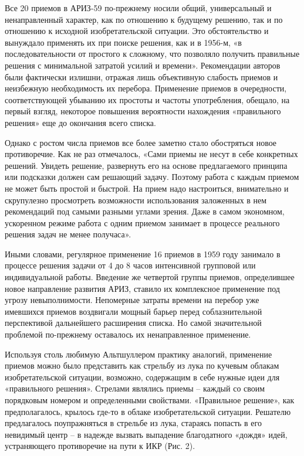 \documentclass[11pt,a4paper]{article}
\begin{document}
Все 20 приемов в АРИЗ-59 по-прежнему носили общий, универсальный и
ненаправленный характер, как по отношению к будущему решению, так и по
отношению к исходной изобретательской ситуации. Это обстоятельство и вынуждало
применять их при поиске решения, как и в 1956-м, «в последовательности от
простого к сложному, что позволяло получить правильные решения с минимальной
затратой усилий и времени». Рекомендации авторов были фактически излишни,
отражая лишь объективную слабость приемов и неизбежную необходимость их
перебора. Применение приемов в очередности, соответствующей убыванию их
простоты и частоты употребления, обещало, на первый взгляд, некоторое
повышения вероятности нахождения «правильного решения» еще до окончания всего
списка.

Однако с ростом числа приемов все более заметно стало обостряться новое
противоречие. Как не раз отмечалось, «Сами приемы не несут в себе конкретных
решений. Увидеть решение, развернуть его на основе предлагаемого принципа или
подсказки должен сам решающий задачу. Поэтому работа с каждым приемом не может
быть простой и быстрой. На прием надо настроиться, внимательно и скрупулезно
просмотреть возможности использования заложенных в нем рекомендаций под самыми
разными углами зрения. Даже в самом экономном, ускоренном режиме работа с
одним приемом занимает в процессе реального решения задач не менее
получаса». \cite{Kudryavtsev}

Иными словами, регулярное применение 16 приемов в 1959 году занимало в
процессе решения задачи от 4 до 8 часов интенсивной групповой или
индивидуальной работы. Введение же четвертой группы приемов, определившее
новое направление развития АРИЗ, ставило их комплексное применение под угрозу
невыполнимости. Непомерные затраты времени на перебор уже имевшихся приемов
воздвигали мощный барьер перед соблазнительной перспективой дальнейшего
расширения списка. Но самой значительной проблемой по-прежнему оставалось их
ненаправленное применение.

Используя столь любимую Альтшуллером практику аналогий, применение приемов
можно было представить как стрельбу из лука по кучевым облакам
изобретательской ситуации, возможно, содержащим в себе нужные идеи для
«правильного решения». Стрелами являлись приемы -- каждый со своим порядковым
номером и определенными свойствами. «Правильное решение», как предполагалось,
крылось где-то в облаке изобретательской ситуации. Решателю предлагалось
поупражняться в стрельбе из лука, стараясь попасть в его невидимый центр -- в
надежде вызвать выпадение благодатного «дождя» идей, устраняющего противоречие
на пути к ИКР (Рис. 2).
\end{document}
